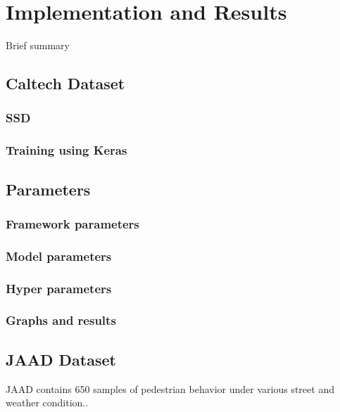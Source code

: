 \chapter{Implementation and Results}

Brief summary

\section{Caltech Dataset}
\subsection{SSD}
\subsection{Training using Keras}
\section{Parameters}
\subsection{Framework parameters}
\subsection{Model parameters}
\subsection{Hyper parameters}
\subsection{Graphs and results}

\section{JAAD Dataset}
JAAD \cite{rasouli2017agreeing} contains 650 samples of pedestrian behavior under various street and weather condition.. 